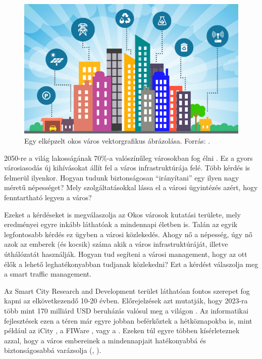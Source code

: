 \documentclass[a4paper,12pt]{report}
\begin{document}
\begin{figure}[h]
\centerline{
\includegraphics[width=6in]{img/smartcitylogo}}
\caption{Egy elképzelt okos város vektorgrafikus ábrázolása. Forrás: \cite{smartcitylogo}.}
\label{smartcitylogo}
\end{figure}

\vspace{2mm}
2050-re a világ lakosságának 70\%-a valószínűleg városokban fog élni \cite{unpopulation}. Ez a gyors városiasodás új kihívásokat állít fel a város infrastruktúrája felé. Több kérdés is felmerül ilyenkor. Hogyan tudunk biztonságosan ``irányítani'' egy ilyen nagy méretű népességet? Mely szolgáltatásokkal lássa el a városi ügyintézés azért, hogy fenntartható legyen a város? 

\vspace{2mm}
Ezeket a kérdéseket is megválaszolja az Okos városok kutatási területe, mely eredményei egyre inkább láthatóak a mindennapi életben is. Talán az egyik legfontosabb kérdés ez ügyben a városi közlekedés. Ahogy nő a népesség, úgy nő azok az emberek (és kocsik) száma akik a város infrastruktúráját, illetve úthálózatát használják. Hogyan tud segíteni a városi management, hogy az ott élők a lehető leghatékonyabban tudjanak közlekedni? Ezt a kérdést válaszolja meg a smart traffic management.

\vspace{2mm}
Az Smart City Research and Development terület láthatóan fontos szerepet fog kapni az elkövetkezendő 10-20 évben. Előrejelzések azt mutatják, hogy 2023-ra több mint 170 milliárd USD beruházás valósul meg a világon \cite{navigant}. Az informatikai fejlesztések ezen a téren már egyre jobban beférkőztek a hétköznapokba is, mint például az iCity \cite{icity}, a FI\-Ware \cite{fiware}, vagy a \cite{vital}. Ezeken túl egyre többen kísérleteznek azzal, hogy a város embereinek a mindennapjait hatékonyabbá és biztonságosabbá varázsolja (\cite{myneighbourhood}, \cite{smartsantander}). 
\end{document}
